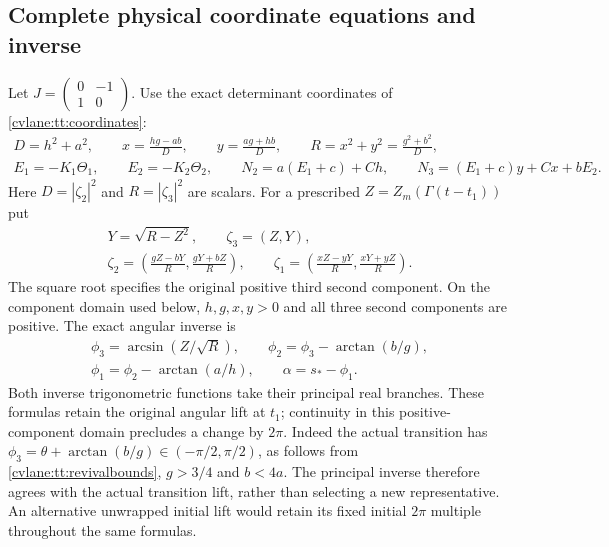 \subsection{Complete physical coordinate equations and inverse}

Let $J=\left(\begin{smallmatrix}0&-1\\1&0\end{smallmatrix}\right)$.
Use the exact determinant coordinates of \eqref{cvlane:tt:coordinates}:
\begin{equation}\label{cvlane:tr:coordinates}
 \begin{gathered}
 D=h^2+a^2,\qquad
 x=\frac{hg-ab}{D},\qquad y=\frac{ag+hb}{D},\qquad
 R=x^2+y^2=\frac{g^2+b^2}{D},\\
 E_1=-K_1\Theta_1,\qquad E_2=-K_2\Theta_2,\qquad
 N_2=a(E_1+c)+Ch,\qquad
 N_3=(E_1+c)y+Cx+bE_2.
 \end{gathered}
\end{equation}
Here $D=|\zeta_2|^2$ and $R=|\zeta_3|^2$ are scalars.
For a prescribed $Z=Z_m(\Gamma(t-t_1))$ put
\begin{equation}\label{cvlane:tr:inverse}
 \begin{gathered}
 Y=\sqrt{R-Z^2},\qquad \zeta_3=(Z,Y),\\
 \zeta_2=\left(\frac{gZ-bY}{R},\frac{gY+bZ}{R}\right),
 \qquad
 \zeta_1=\left(\frac{xZ-yY}{R},\frac{xY+yZ}{R}\right).
 \end{gathered}
\end{equation}
The square root specifies the original positive third second component.
On the component domain used below, $h,g,x,y>0$ and all three
second components are positive. The exact angular inverse is
\begin{equation}\label{cvlane:tr:angles}
 \begin{gathered}
 \phi_3=\arcsin(Z/\sqrt R),\qquad
 \phi_2=\phi_3-\arctan(b/g),\\
 \phi_1=\phi_2-\arctan(a/h),\qquad
 \alpha=s_*-\phi_1.
 \end{gathered}
\end{equation}
Both inverse trigonometric functions take their principal real branches.
These formulas retain the original angular lift at $t_1$; continuity
in this positive-component domain precludes a change by $2\pi$.
Indeed the actual transition has
$\phi_3=\theta+\arctan(b/g)\in(-\pi/2,\pi/2)$, as follows
from \eqref{cvlane:tt:revivalbounds}, $g>3/4$ and $b<4a$.
The principal inverse therefore agrees with the actual transition
lift, rather than selecting a new representative. An alternative
unwrapped initial lift would retain its fixed initial $2\pi$ multiple
throughout the same formulas.

